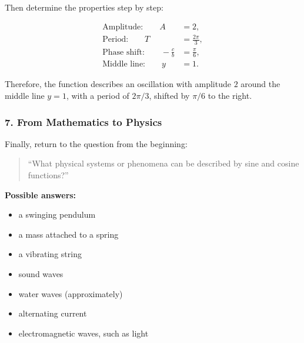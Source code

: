 \documentclass[a4paper,11pt]{article}
\begin{document}
Then determine the properties step by step:

\begin{align}
    \text{Amplitude:}\qquad
    A &= 2,\\
    \text{Period:}\qquad
    T &= \frac{2\pi}{3},\\
    \text{Phase shift:}\qquad
    -\frac{c}{b}
      &= \frac{\pi}{6},\\
    \text{Middle line:}\qquad
    y &= 1.
\end{align}

Therefore, the function describes an oscillation with amplitude $2$
around the middle line $y=1$, with a period of $2\pi/3$, shifted by
$\pi/6$ to the right.


\subsubsection*{7. From Mathematics to Physics}

Finally, return to the question from the beginning:

\begin{quote}
    ``What physical systems or phenomena can be described by sine and cosine functions?''
\end{quote}


\textbf{Possible answers:}
\begin{itemize}
    \item a swinging pendulum
    \item a mass attached to a spring
    \item a vibrating string
    \item sound waves
    \item water waves (approximately)
    \item alternating current
    \item electromagnetic waves, such as light
\end{itemize}
\end{document}
